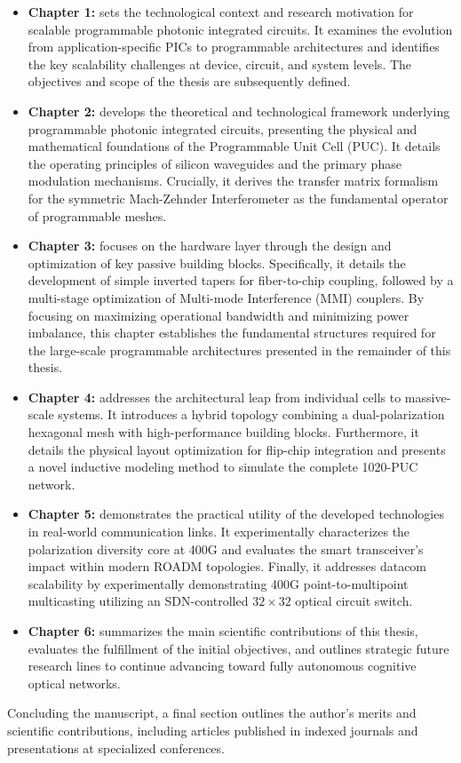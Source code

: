 \begin{itemize}
	\item \textbf{Chapter 1: }  sets the technological context and research 
		motivation for scalable programmable photonic integrated circuits. It examines the 
		evolution from application-specific PICs to programmable architectures and identifies the 
		key scalability challenges at device, circuit, and system levels. The objectives and scope 
		of the thesis are subsequently defined.
	\item \textbf{Chapter 2: } develops the theoretical and technological 
		framework underlying programmable photonic integrated circuits, presenting the physical and 
		mathematical foundations of the Programmable Unit Cell (PUC). It details the operating 
		principles of silicon waveguides and the primary phase modulation mechanisms. Crucially, it 
		derives the transfer matrix formalism for the symmetric Mach-Zehnder Interferometer as the 
		fundamental operator of programmable meshes.
		
	\item \textbf{Chapter 3: } focuses on the hardware layer through the design 
	and optimization of key passive building blocks. Specifically, it details the development of 
	simple inverted tapers for fiber-to-chip coupling, followed by a multi-stage optimization of 
	Multi-mode Interference (MMI) couplers. By focusing on maximizing operational bandwidth and 
	minimizing power imbalance, this chapter establishes the fundamental structures required for 
	the large-scale programmable architectures presented in the remainder of this thesis.

	\item \textbf{Chapter 4: } addresses the architectural leap from 
	individual cells to massive-scale systems. It introduces a hybrid topology combining a 
	dual-polarization hexagonal mesh with high-performance building blocks. Furthermore, it details 
	the physical layout optimization for flip-chip integration and presents a novel inductive 
	modeling method to simulate the complete 1020-PUC network.

    \item \textbf{Chapter 5: } demonstrates the practical utility of the 
	developed technologies in real-world communication links. It experimentally characterizes the 
	polarization diversity core at 400G and evaluates the smart transceiver's impact within modern 
	ROADM topologies. Finally, it addresses datacom scalability by experimentally demonstrating 
	400G point-to-multipoint multicasting utilizing an SDN-controlled $32\times32$ optical circuit 
	switch.

    \item \textbf{Chapter 6: } summarizes the main scientific contributions 
	of this thesis, evaluates the fulfillment of the initial objectives, and outlines strategic 
	future research lines to continue advancing toward fully autonomous cognitive optical networks.
	
\end{itemize}


Concluding the manuscript, a final section outlines the author's merits and scientific 
contributions, including articles published in indexed journals and presentations at specialized 
conferences.
